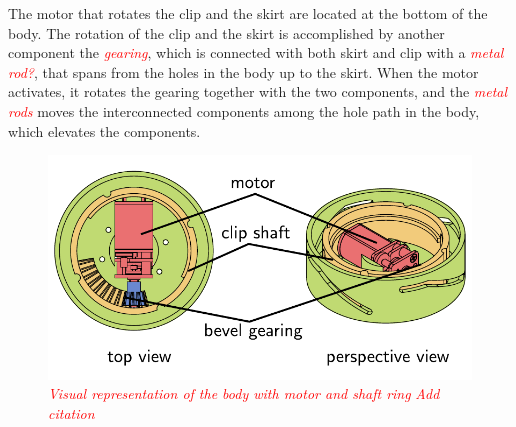 \documentclass[
  digital,     %
  oneside,     %
  nosansbold,  %
  nocolorbold, %
  lof,         %
  lot,         %
]{fithesis4}
\newcommand{\TODO}[1]{\textcolor{red}{\textit{#1}}}
\begin{document}
The motor that rotates the clip and the skirt are located at the bottom of the body. The rotation of the clip and the skirt is accomplished by another component the \TODO{gearing}, which is connected with both skirt and clip with a \TODO{metal rod?}, that spans from the holes in the body up to the skirt. When the motor activates, it rotates the gearing together with the two components, and the \TODO{metal rods} moves the interconnected components among the hole path in the body, which elevates the components.

\begin{figure}
    \centering
    \includegraphics{ dock_arrangement.pdf }
    \caption{ \TODO{ Visual representation of the body with motor and shaft ring } \TODO{Add citation} }
    \label{ fig:dock-arrangement }
\end{figure}

\end{document}
